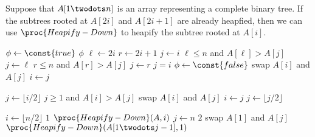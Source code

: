 \begin{algorithm}
  Suppose that $A[1 \twodots n]$ is an array representing a complete binary
  tree.
  If the subtrees rooted at $A[2i]$ and $A[2i+1]$ are already heapfied, then we
  can use $\proc{Heapify-Down}$ to heapify the subtree rooted at $A[i]$.
  \begin{codebox}
    \li $\phi \gets \const{true}$
    \li \While $\phi$ \Do
    \li     $\ell \gets 2i$
    \li     $r \gets 2i+1$
    \li     $j \gets i$
    \li     \If $\ell \leq n$ and $A[\ell] > A[j]$ \Then
    \li         $j \gets \ell$
            \End
    \li     \If $r \leq n$ and $A[r] > A[j]$ \Then
    \li         $j \gets r$
            \End
    \li     \If $j = i$ \Then
    \li         $\phi \gets \const{false}$
    \li     \Else
    \li         swap $A[i]$ and $A[j]$
    \li         $i \gets j$
            \End
        \End
  \end{codebox}
\end{algorithm}

\begin{codebox}
  \li $j \gets \lfloor i/2 \rfloor$
  \li \While $j \geq 1$ and $A[i] > A[j]$ \Do
  \li     swap $A[i]$ and $A[j]$
  \li     $i \gets j$
  \li     $j \gets \lfloor j/2 \rfloor$
      \End
\end{codebox}

\begin{codebox}
  \li \For $i \gets \lfloor n/2 \rfloor$ \Downto $1$ \Do
  \li     $\proc{Heapify-Down}(A, i)$
      \End
  \li \For $j \gets n$ \Downto $2$ \Do
  \li     swap $A[1]$ and $A[j]$
  \li     $\proc{Heapify-Down}(A[1 \twodots j-1], 1)$
      \End
\end{codebox}
